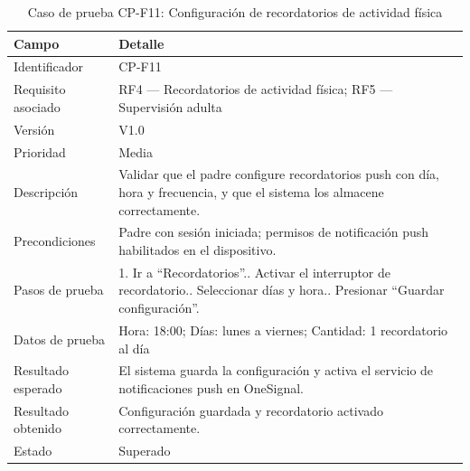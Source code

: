 				\begin{table}[H]
					\centering\small
					\caption{Caso de prueba CP-F11: Configuración de recordatorios de actividad física}
					\label{tab:cpf11}
					\begin{tabular}{p{3cm}p{12.0cm}}
						\hline
						\textbf{Campo} & \textbf{Detalle}\\
						\hline
						Identificador & CP-F11\\
						Requisito asociado & RF4 --- Recordatorios de actividad física; RF5 --- Supervisión adulta\\
						Versión & V1.0\\
						Prioridad & Media\\
						Descripción & Validar que el padre configure recordatorios push con día, hora y frecuencia, y que el sistema los almacene correctamente.\\
						Precondiciones & Padre con sesión iniciada; permisos de notificación push habilitados en el dispositivo.\\
						Pasos de prueba & 1. Ir a ``Recordatorios''.\newline 2. Activar el interruptor de recordatorio.\newline 3. Seleccionar días y hora.\newline 4. Presionar ``Guardar configuración''.\\
						Datos de prueba & Hora: 18:00; Días: lunes a viernes; Cantidad: 1 recordatorio al día\\
						Resultado esperado & El sistema guarda la configuración y activa el servicio de notificaciones push en OneSignal.\\
						Resultado obtenido & Configuración guardada y recordatorio activado correctamente.\\
						Estado & Superado\\
						\hline
					\end{tabular}
				\end{table}
				\tblnote
				
